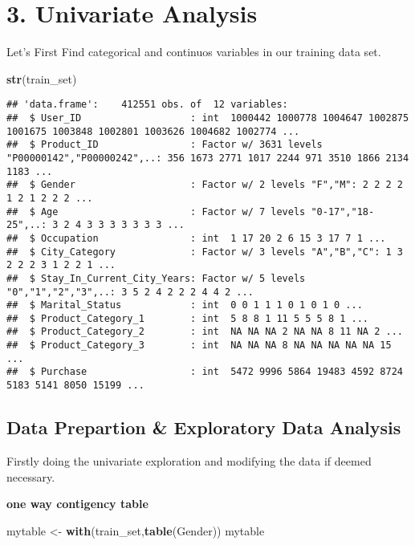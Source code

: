 \documentclass[]{article}
\newenvironment{Shaded}{\begin{snugshade}}{\end{snugshade}}
\newcommand{\KeywordTok}[1]{\textcolor[rgb]{0.13,0.29,0.53}{\textbf{#1}}}
\newcommand{\StringTok}[1]{\textcolor[rgb]{0.31,0.60,0.02}{#1}}
\newcommand{\NormalTok}[1]{#1}
\begin{document}
\section{3. Univariate Analysis}\label{univariate-analysis}

Let's First Find categorical and continuos variables in our training
data set.

\begin{Shaded}
\begin{Highlighting}[]
\KeywordTok{str}\NormalTok{(train_set)}
\end{Highlighting}
\end{Shaded}

\begin{verbatim}
## 'data.frame':    412551 obs. of  12 variables:
##  $ User_ID                   : int  1000442 1000778 1004647 1002875 1001675 1003848 1002801 1003626 1004682 1002774 ...
##  $ Product_ID                : Factor w/ 3631 levels "P00000142","P00000242",..: 356 1673 2771 1017 2244 971 3510 1866 2134 1183 ...
##  $ Gender                    : Factor w/ 2 levels "F","M": 2 2 2 2 1 2 1 2 2 2 ...
##  $ Age                       : Factor w/ 7 levels "0-17","18-25",..: 3 2 4 3 3 3 3 3 3 3 ...
##  $ Occupation                : int  1 17 20 2 6 15 3 17 7 1 ...
##  $ City_Category             : Factor w/ 3 levels "A","B","C": 1 3 2 2 2 3 1 2 2 1 ...
##  $ Stay_In_Current_City_Years: Factor w/ 5 levels "0","1","2","3",..: 3 5 2 4 2 2 2 4 4 2 ...
##  $ Marital_Status            : int  0 0 1 1 1 0 1 0 1 0 ...
##  $ Product_Category_1        : int  5 8 8 1 11 5 5 5 8 1 ...
##  $ Product_Category_2        : int  NA NA NA 2 NA NA 8 11 NA 2 ...
##  $ Product_Category_3        : int  NA NA NA 8 NA NA NA NA NA 15 ...
##  $ Purchase                  : int  5472 9996 5864 19483 4592 8724 5183 5141 8050 15199 ...
\end{verbatim}

\subsection{Data Prepartion \& Exploratory Data
Analysis}\label{data-prepartion-exploratory-data-analysis}

Firstly doing the univariate exploration and modifying the data if
deemed necessary.

\textbf{one way contigency table}

\begin{Shaded}
\begin{Highlighting}[]
\NormalTok{mytable <-}\StringTok{ }\KeywordTok{with}\NormalTok{(train_set,}\KeywordTok{table}\NormalTok{(Gender))}
\NormalTok{mytable}
\end{Highlighting}
\end{Shaded}
\end{document}
